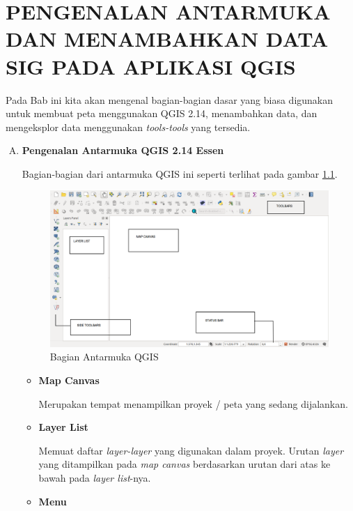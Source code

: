 \chapter{PENGENALAN ANTARMUKA DAN MENAMBAHKAN DATA SIG PADA APLIKASI QGIS}

Pada Bab ini kita akan mengenal bagian-bagian dasar yang biasa digunakan untuk membuat peta menggunakan QGIS 2.14, menambahkan data, dan mengeksplor data menggunakan \textit{tools-tools} yang tersedia.

\begin{enumerate}[A.]

\item \textbf{Pengenalan Antarmuka QGIS 2.14 Essen}

Bagian-bagian dari antarmuka QGIS ini seperti terlihat pada gambar \ref{fig:bagianui}.

\begin{figure}[H]
  \centering
  \includegraphics[width=1\textwidth]{./resources/004-bagian-qgis}
  \caption{Bagian Antarmuka QGIS}
  \label{fig:bagianui}
\end{figure}

\begin{itemize}

\item \textbf{Map Canvas}

Merupakan tempat menampilkan proyek / peta yang sedang dijalankan.

\item \textbf{Layer List}

Memuat daftar \textit{layer-layer} yang digunakan dalam proyek. Urutan \textit{layer} yang ditampilkan pada \textit{map canvas} berdasarkan urutan dari atas ke bawah pada \textit{layer list}-nya.

\item \textbf{Menu}


\end{itemize}
\end{enumerate}

